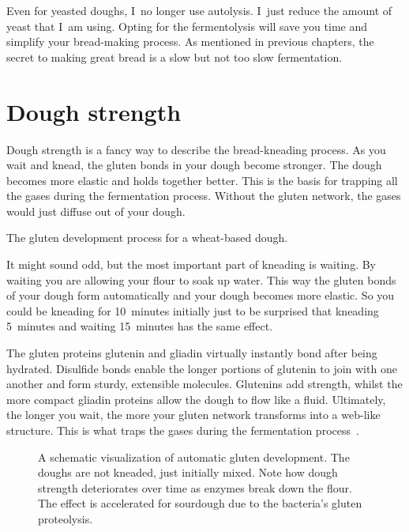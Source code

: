 Even for yeasted doughs, I~no longer use autolysis. I~just reduce the amount
of yeast that I~am using. Opting for the fermentolysis will
save you time and simplify your bread-making process. As mentioned in previous chapters,
the secret to making great bread is a slow but not too slow fermentation.

\section{Dough strength}

Dough strength is a fancy way to describe the bread-kneading process. As you wait and
knead, the gluten bonds in your dough become stronger. The dough
becomes more elastic and holds together better. This is the basis for trapping
all the gases during the fermentation process. Without the gluten network,
the gases would just diffuse out of your dough.

\begin{flowchart}[!htb]
\centering
  
  \caption{The gluten development process for a wheat-based dough.}%
  \label{fig:wheat-sourdough-kneading-process}
\end{flowchart}

It might sound odd, but the most important part of kneading is waiting. By
waiting you are allowing your flour to soak up water. This way the gluten
bonds of your dough form automatically and your dough becomes more elastic.
So you could be kneading for 10~minutes initially just to be surprised
that kneading 5~minutes and waiting 15~minutes has the same effect.

The gluten proteins glutenin and gliadin virtually instantly bond after being
hydrated. Disulfide bonds enable the longer portions of
glutenin to join with one another and form sturdy, extensible molecules.
Glutenins add strength, whilst the more compact gliadin proteins allow
the dough to flow like a fluid. Ultimately, the longer you wait, the more
your gluten network transforms into a web-like structure. This is what
traps the gases during the fermentation process~\cite{how+does+gluten+work}.

\begin{figure}[!htb]
  \centering
  
  \caption[Dough strength over time without kneading]{A schematic
      visualization of automatic gluten development. The doughs are not
      kneaded, just initially mixed.  Note how dough strength deteriorates
      over time as enzymes break down the flour. The effect is accelerated for
      sourdough due to the bacteria's gluten proteolysis.}%
  \label{fig:wheat-yeast-sourdough-degradation}
\end{figure}

